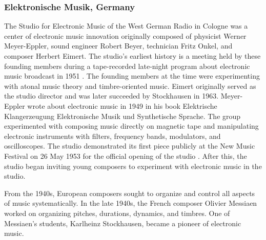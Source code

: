 \documentclass[letterpaper, 12pt]{article}
\begin{document}
\subsubsection{Elektronische Musik, Germany}


%
The Studio for Electronic Music of the West German Radio in Cologne was a center of electronic music innovation originally composed of physicist Werner Meyer-Eppler, sound engineer Robert Beyer, technician Fritz Onkel, and composer Herbert Eimert.
%
The studio's earliest history is a meeting held by these founding members during a tape-recorded late-night program about electronic music broadcast in 1951 \citep{morawska1988schwingende}.
%
The founding members at the time were experimenting with atonal music theory and timbre-oriented music.
%
Eimert originally served as the studio director and was later succeeded by Stockhausen in 1963.
%
Meyer-Eppler wrote about electronic music in 1949 in his book Elektrische Klangerzeugung Elektronische Musik und Synthetische Sprache.
%
The group experimented with composing music directly on magnetic tape and manipulating electronic instruments with filters, frequency bands, modulators, and oscilloscopes.
%
The studio demonstrated its first piece publicly at the New Music Festival on 26 May 1953 for the official opening of the studio \citep{morawska1988schwingende}.
%
After this, the studio began inviting young composers to experiment with electronic music in the studio.
%


%
From the 1940s, European composers sought to organize and control all aspects of music systematically.
%
In the late 1940s, the French composer Olivier Messiaen worked on organizing pitches, durations, dynamics, and timbres.
%
One of Messiaen's students, Karlheinz Stockhausen, became a pioneer of electronic music.
%
\end{document}

